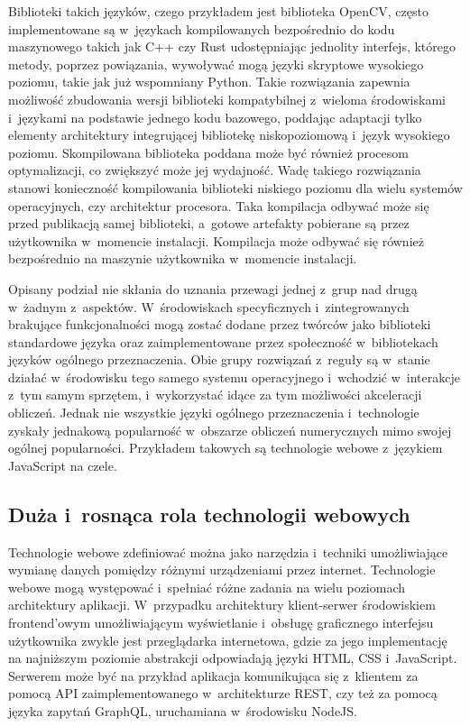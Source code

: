 Biblioteki takich języków, czego przykładem jest biblioteka OpenCV, często implementowane są w~językach kompilowanych bezpośrednio do kodu maszynowego takich jak C++ czy Rust udostępniając jednolity interfejs, którego metody, poprzez powiązania, wywoływać mogą języki skryptowe wysokiego poziomu, takie jak już wspomniany Python. Takie rozwiązania zapewnia możliwość zbudowania wersji biblioteki kompatybilnej z~wieloma środowiskami i~językami na podstawie jednego kodu bazowego, poddając adaptacji tylko elementy architektury integrującej bibliotekę niskopoziomową i~język wysokiego poziomu. Skompilowana biblioteka poddana może być również procesom optymalizacji, co zwiększyć może jej wydajność. Wadę takiego rozwiązania stanowi konieczność kompilowania biblioteki niskiego poziomu dla wielu systemów operacyjnych, czy architektur procesora. Taka kompilacja odbywać może się przed publikacją samej biblioteki, a~gotowe artefakty pobierane są przez użytkownika w~momencie instalacji. Kompilacja może odbywać się również bezpośrednio na maszynie użytkownika w~momencie instalacji.

Opisany podział nie skłania do uznania przewagi jednej z~grup nad drugą w~żadnym z~aspektów. W~środowiskach specyficznych i~zintegrowanych brakujące funkcjonalności mogą zostać dodane przez twórców jako biblioteki standardowe języka oraz zaimplementowane przez społeczność w~bibliotekach języków ogólnego przeznaczenia. Obie grupy rozwiązań z~reguły są w~stanie działać w~środowisku tego samego systemu operacyjnego i~wchodzić w~interakcje z~tym samym sprzętem, i~wykorzystać idące za tym możliwości akceleracji obliczeń. Jednak nie wszystkie języki ogólnego przeznaczenia i~technologie zyskały jednakową popularność w~obszarze obliczeń numerycznych mimo swojej ogólnej popularności. Przykładem takowych są technologie webowe z~językiem JavaScript na czele.

\subsection{Duża i~rosnąca rola technologii webowych}

Technologie webowe zdefiniować można jako narzędzia i~techniki umożliwiające wymianę danych pomiędzy różnymi urządzeniami przez internet. Technologie webowe mogą występować i~spełniać różne zadania na wielu poziomach architektury aplikacji. W~przypadku architektury klient-serwer środowiskiem frontend'owym umożliwiającym wyświetlanie i~obsługę graficznego interfejsu użytkownika zwykle jest przeglądarka internetowa, gdzie za jego implementację na najniższym poziomie abstrakcji odpowiadają języki HTML, CSS i~JavaScript. Serwerem może być na przykład aplikacja komunikująca się z~klientem za pomocą API zaimplementowanego w~architekturze REST, czy też za pomocą języka zapytań GraphQL, uruchamiana w~środowisku NodeJS. 

